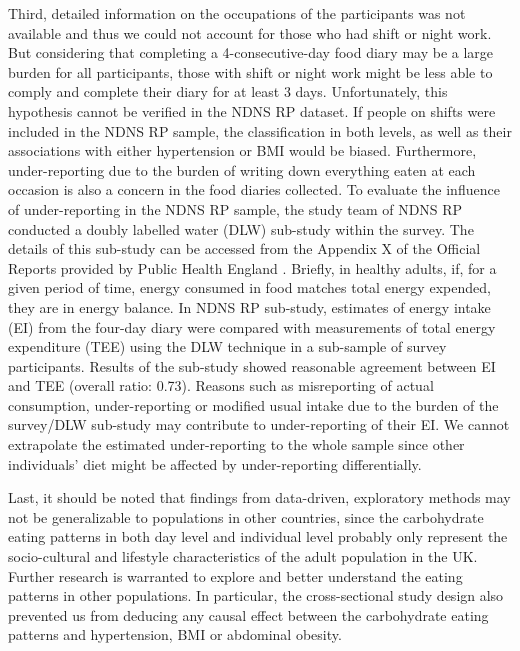 Third, detailed information on the occupations of the participants was not available and thus we could not account for those who had shift or night work. But considering that completing a 4-consecutive-day food diary may be a large burden for all participants, those with shift or night work might be less able to comply and complete their diary for at least 3 days. Unfortunately, this hypothesis cannot be verified in the NDNS RP dataset. If people on shifts were included in the NDNS RP sample, the classification in both levels, as well as their associations with either hypertension or BMI would be biased. Furthermore, under-reporting due to the burden of writing down everything eaten at each occasion is also a concern in the food diaries collected. To evaluate the influence of under-reporting in the NDNS RP sample, the study team of NDNS RP conducted a doubly labelled water (DLW) sub-study within the survey. The details of this sub-study can be accessed from the Appendix X of the Official Reports provided by Public Health England \parencite{bates2014national,roberts2018national,NDNSofficial}. Briefly, in healthy adults, if, for a given period of time, energy consumed in food matches total energy expended, they are in energy balance. In NDNS RP sub-study, estimates of energy intake (EI) from the four-day diary were compared with measurements of total energy expenditure (TEE) using the DLW technique in a sub-sample of survey participants. Results of the sub-study showed reasonable agreement between EI and TEE (overall ratio: 0.73). Reasons such as misreporting of actual consumption, under-reporting or modified usual intake due to the burden of the survey/DLW sub-study may contribute to under-reporting of their EI. We cannot extrapolate the estimated under-reporting to the whole sample since other individuals' diet might be affected by under-reporting differentially. 

Last, it should be noted that findings from data-driven, exploratory methods may not be
generalizable to populations in other countries, since the carbohydrate eating patterns in both day level and individual level probably only represent the socio-cultural and lifestyle characteristics of the adult population in the UK. Further research is warranted to explore and better understand the eating patterns in other populations. In particular, the cross-sectional study design also prevented us from deducing any causal effect between the carbohydrate eating patterns and hypertension, BMI or abdominal obesity. 

